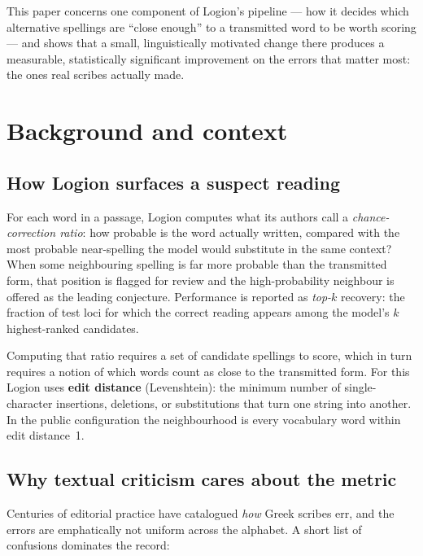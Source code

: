 \documentclass[11pt]{article}
\begin{document}
This paper concerns one component of Logion's pipeline --- how it decides
which alternative spellings are ``close enough'' to a transmitted word to be worth
scoring --- and shows that a small, linguistically motivated change there
produces a measurable, statistically significant improvement on the
errors that matter most: the ones real scribes actually made.

\section{Background and context}

\subsection{How Logion surfaces a suspect reading}

For each word in a passage, Logion computes what its authors call a
\emph{chance-correction ratio}: how probable is the word actually written,
compared with the most probable near-spelling the model would substitute in the
same context? When some neighbouring spelling is far more probable than the
transmitted form, that position is flagged for review and the high-probability
neighbour is offered as the leading conjecture. Performance is reported as
\emph{top-$k$} recovery: the fraction of test loci for which the correct reading
appears among the model's $k$ highest-ranked candidates.

Computing that ratio requires a set of candidate spellings to score, which in turn
requires a notion of which words count as close to the transmitted form. For this
Logion uses \textbf{edit distance} (Levenshtein): the minimum number of
single-character insertions, deletions, or substitutions that turn one string into
another. In the public configuration the neighbourhood is every vocabulary word
within edit distance~1.

\subsection{Why textual criticism cares about the metric}

Centuries of editorial practice have catalogued \emph{how} Greek scribes err, and
the errors are emphatically not uniform across the alphabet. A short list of
confusions dominates the record:
\end{document}
